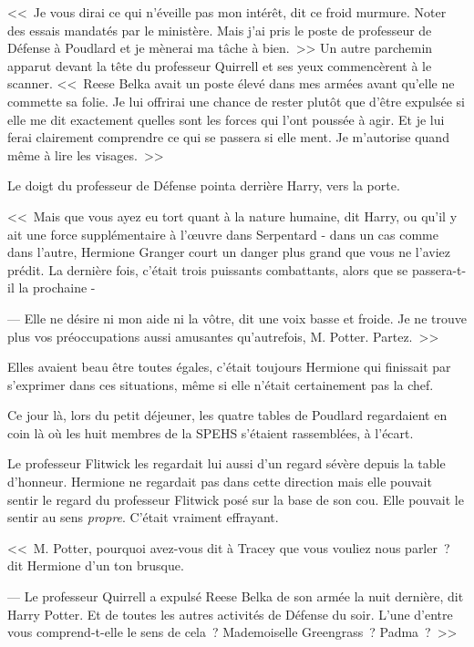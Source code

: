 <<~Je vous dirai ce qui n'éveille pas mon intérêt, dit ce froid murmure. Noter des essais mandatés par le ministère. Mais j'ai pris le poste de professeur de Défense à Poudlard et je mènerai ma tâche à bien.~>> Un autre parchemin apparut devant la tête du professeur Quirrell et ses yeux commencèrent à le scanner. <<~Reese Belka avait un poste élevé dans mes armées avant qu'elle ne commette sa folie. Je lui offrirai une chance de rester plutôt que d'être expulsée si elle me dit exactement quelles sont les forces qui l'ont poussée à agir. Et je lui ferai clairement comprendre ce qui se passera si elle ment. Je m'autorise quand même à lire les visages.~>>

Le doigt du professeur de Défense pointa derrière Harry, vers la porte.

<<~Mais que vous ayez eu tort quant à la nature humaine, dit Harry, ou qu'il y ait une force supplémentaire à l'œuvre dans Serpentard - dans un cas comme dans l'autre, Hermione Granger court un danger plus grand que vous ne l'aviez prédit. La dernière fois, c'était trois puissants combattants, alors que se passera-t-il la prochaine -

--- Elle ne désire ni mon aide ni la vôtre, dit une voix basse et froide. Je ne trouve plus vos préoccupations aussi amusantes qu'autrefois, M. Potter. Partez.~>>

\later

Elles avaient beau être toutes égales, c'était toujours Hermione qui finissait par s'exprimer dans ces situations, même si elle n'était certainement pas la chef.

Ce jour là, lors du petit déjeuner, les quatre tables de Poudlard regardaient en coin là où les huit membres de la SPEHS s'étaient rassemblées, à l'écart.

Le professeur Flitwick les regardait lui aussi d'un regard sévère depuis la table d'honneur. Hermione ne regardait pas dans cette direction mais elle pouvait sentir le regard du professeur Flitwick posé sur la base de son cou. Elle pouvait le sentir au sens \emph{propre}. C'était vraiment effrayant.

<<~M. Potter, pourquoi avez-vous dit à Tracey que vous vouliez nous parler~? dit Hermione d'un ton brusque.

--- Le professeur Quirrell a expulsé Reese Belka de son armée la nuit dernière, dit Harry Potter. Et de toutes les autres activités de Défense du soir. L'une d'entre vous comprend-t-elle le sens de cela~? Mademoiselle Greengrass~? Padma~?~>>

